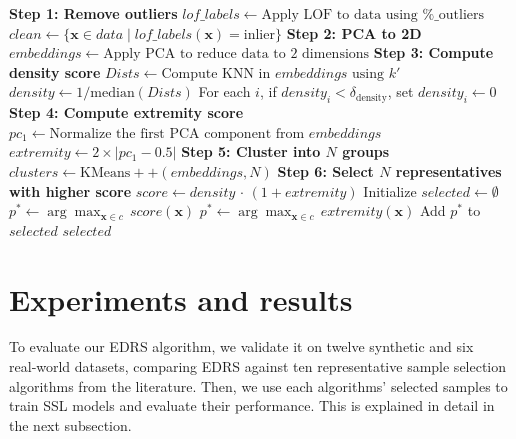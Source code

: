 \documentclass[preprint,12pt]{elsarticle}
\begin{document}
\begin{algorithm}[!t]
\caption{\scriptsize EDRS: Extremity Density Representative Selection}
\label{algo:edrs}
\scriptsize            %
\begin{algorithmic}[1]
    \State \textbf{Step 1: Remove outliers}  
    \State $\mathit{lof\_labels} \gets \text{Apply LOF to data using \%\_outliers}$  
    \State $\mathit{clean} \gets \{\mathbf x \in \mathit{data} \mid \mathit{lof\_labels}(\mathbf x)=\text{inlier}\}$  
    \State \textbf{Step 2: PCA to 2D}  
    \State $\mathit{embeddings} \gets \text{Apply PCA to reduce data to 2 dimensions}$  
    \State \textbf{Step 3: Compute density score}
    \State $\mathit{Dists} \gets \text{Compute KNN in } embeddings \text{ using } k'$  
    \State $\mathit{density} \gets 1 / \mathrm{median}(\mathit{Dists})$  
    \State For each $i$, if $\mathit{density}_i < \delta_{\mathrm{density}}$, set $\mathit{density}_i \gets 0$  
    \State \textbf{Step 4: Compute extremity score}  
    \State $\mathit{pc_1} \gets \text{Normalize the first PCA component from } embeddings$  
    \State $\mathit{extremity} \gets 2 \times |\mathit{pc_1} - 0.5|$  
    \State \textbf{Step 5: Cluster into $N$ groups}  
    \State $\mathit{clusters} \gets \mathrm{KMeans++}(embeddings, N)$   
    \State \textbf{Step 6: Select $N$ representatives with higher score}
    \State $\mathit{score} \gets \mathit{density}\,\cdot\,(1 + \mathit{extremity})$  
    \State Initialize $\mathit{selected} \gets \emptyset$
        \State $p^* \gets \arg\max_{\mathbf{x}\in c}\,\mathit{score}(\mathbf{x})$
            \State $p^* \gets \arg\max_{\mathbf{x}\in c}\,\mathit{extremity}(\mathbf{x})$
        \EndIf
        \State Add $p^*$ to $\mathit{selected}$
    \EndFor
    \State \Return $\mathit{selected}$
\EndProcedure
\end{algorithmic}
\end{algorithm}


\section{Experiments and results} \label{sec:experiment}

To evaluate our EDRS algorithm, we validate it on twelve synthetic and six real‑world datasets, comparing EDRS against ten representative sample selection algorithms from the literature. Then, we use each algorithms’ selected samples to train SSL models and evaluate their performance. This is explained in detail in the next subsection.
\end{document}
